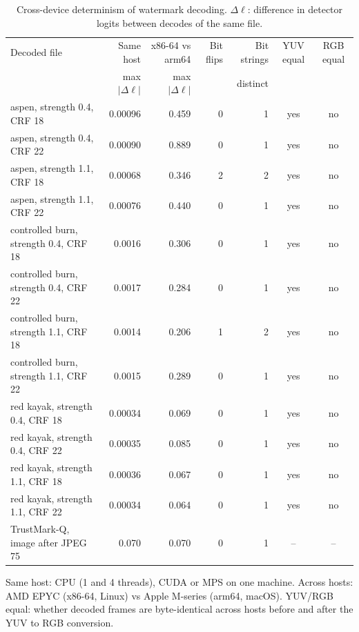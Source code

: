 \begin{table}[!t]
\centering
\footnotesize
\caption{Cross-device determinism of watermark decoding. $\Delta\ell$: difference in detector logits between decodes of the same file.}
\label{tab:wm-stability}
\setlength{\tabcolsep}{3.4pt}
\begin{tabular}{lrrrrcc}
\toprule
Decoded file & Same host & x86-64 vs arm64 & Bit flips & Bit strings & YUV equal & RGB equal \\
  & max $|\Delta\ell|$ & max $|\Delta\ell|$ &   & distinct &   &   \\
\midrule
aspen, strength 0.4, CRF 18 & 0.00096 & 0.459 & 0 & 1 & yes & no \\
aspen, strength 0.4, CRF 22 & 0.00090 & 0.889 & 0 & 1 & yes & no \\
aspen, strength 1.1, CRF 18 & 0.00068 & 0.346 & 2 & 2 & yes & no \\
aspen, strength 1.1, CRF 22 & 0.00076 & 0.440 & 0 & 1 & yes & no \\
controlled burn, strength 0.4, CRF 18 & 0.0016 & 0.306 & 0 & 1 & yes & no \\
controlled burn, strength 0.4, CRF 22 & 0.0017 & 0.284 & 0 & 1 & yes & no \\
controlled burn, strength 1.1, CRF 18 & 0.0014 & 0.206 & 1 & 2 & yes & no \\
controlled burn, strength 1.1, CRF 22 & 0.0015 & 0.289 & 0 & 1 & yes & no \\
red kayak, strength 0.4, CRF 18 & 0.00034 & 0.069 & 0 & 1 & yes & no \\
red kayak, strength 0.4, CRF 22 & 0.00035 & 0.085 & 0 & 1 & yes & no \\
red kayak, strength 1.1, CRF 18 & 0.00036 & 0.067 & 0 & 1 & yes & no \\
red kayak, strength 1.1, CRF 22 & 0.00034 & 0.064 & 0 & 1 & yes & no \\
TrustMark-Q, image after JPEG 75 & 0.070 & 0.070 & 0 & 1 & -- & -- \\
\bottomrule
\end{tabular}
\par\vspace{2pt}\parbox{\linewidth}{\raggedright\scriptsize Same host: CPU (1 and 4 threads), CUDA or MPS on one machine. Across hosts: AMD EPYC (x86-64, Linux) vs Apple M-series (arm64, macOS). YUV/RGB equal: whether decoded frames are byte-identical across hosts before and after the YUV to RGB conversion.}
\end{table}
